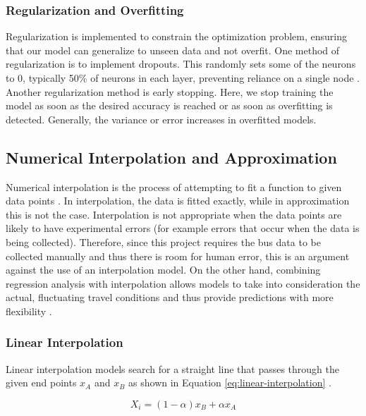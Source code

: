 \subsubsection{Regularization and Overfitting}

Regularization is implemented to constrain the optimization problem, ensuring that our model can generalize to unseen data and not overfit. One method of regularization is to implement dropouts. This randomly sets some of the neurons to 0, typically 50\% of neurons in each layer, preventing reliance on a single node \cite{methods-for-ds-slides}. Another regularization method is early stopping. Here, we stop training the model as soon as the desired accuracy is reached or as soon as overfitting is detected. Generally, the variance or error increases in overfitted models. 

\subsection{Numerical Interpolation and Approximation}

Numerical interpolation is the process of attempting to fit a function to given data points \cite{intro-to-numerical-analysis-atkinson}. In interpolation, the data is fitted exactly, while in approximation this is not the case. Interpolation is not appropriate when the data points are likely to have experimental errors (for example errors that occur when the data is being collected). Therefore, since this project requires the bus data to be collected manually and thus there is room for human error, this is an argument against the use of an interpolation model. On the other hand, combining regression analysis with interpolation allows models to take into consideration the actual, fluctuating travel conditions and thus provide predictions with more flexibility \cite{aviation-regresion-interpolation}.

\subsubsection{Linear Interpolation}

Linear interpolation models search for a straight line that passes through the given end points $x_A$ and $x_B$ as shown in Equation \ref{eq:linear-interpolation} \cite{interpolation-in-time-series}.

\begin{equation}
    \label{eq:linear-interpolation}
    X_i = (1-\alpha)x_B + \alpha x_A
\end{equation}

